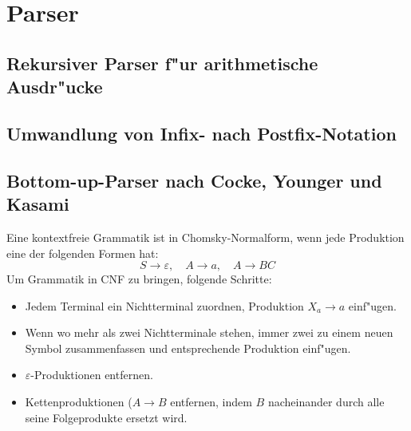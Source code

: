 \section{Parser}

\subsection{Rekursiver Parser f"ur arithmetische Ausdr"ucke}



\subsection{Umwandlung von Infix- nach Postfix-Notation}



\subsection{Bottom-up-Parser nach Cocke, Younger und Kasami}

Eine kontextfreie Grammatik ist in Chomsky-Normalform, wenn jede Produktion eine der folgenden Formen hat:
\[ S \to \varepsilon, \quad A \to a, \quad A \to BC \]
Um Grammatik in CNF zu bringen, folgende Schritte:
\begin{itemize}
\item Jedem Terminal ein Nichtterminal zuordnen, Produktion \(X_a \to a\) einf"ugen.
\item Wenn wo mehr als zwei Nichtterminale stehen, immer zwei zu einem neuen Symbol zusammenfassen und
entsprechende Produktion einf"ugen.
\item \(\varepsilon\)-Produktionen entfernen.
\item Kettenproduktionen (\(A \to B\) entfernen, indem \(B\) nacheinander durch alle seine Folgeprodukte ersetzt wird.
\end{itemize}

